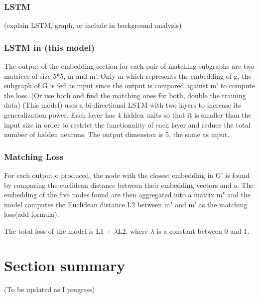 \subsubsection{LSTM}
(explain LSTM, graph, or include in background analysis)

\subsubsection{LSTM in (this model)}
The output of the embedding section for each pair of matching subgraphs are two matrices of size 5*5, m and m'. Only m which represents the embedding of g, the subgraph of G is fed as input since the output is compared against m' to compute the loss. (Or use both and find the matching ones for both, double the training data) (This model) uses a bi-directional LSTM with two layers to increase its generalization power. Each layer has 4 hidden units so that it is smaller than the input size in order to restrict the functionality of each layer and reduce the total number of hidden neurons. The output dimension is 5, the same as input.

\subsubsection{Matching Loss}
For each output o produced, the node with the closest embedding in G' is found by comparing the euclidean distance between their embedding vectors and o. The embedding of the five nodes found are then aggregated into a matrix m" and the model computes the Euclidean distance L2 between m" and m' as the matching loss(add formula). 

The total loss of the model is L1 + $\lambda$L2, where $\lambda$ is a constant between 0 and 1.

\section{Section summary}

(To be updated as I progress)